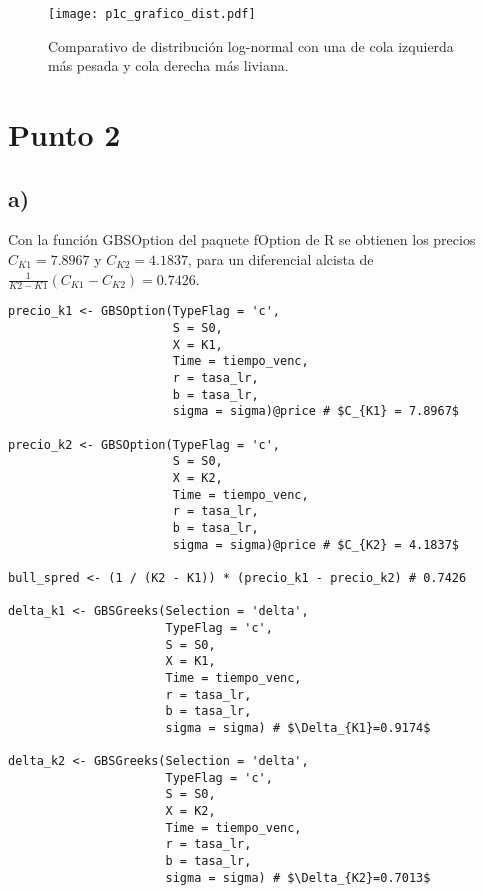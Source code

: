 \documentclass{tufte-handout}
\begin{document}
\begin{figure}
\centering
\texttt{[image: p1c\_grafico\_dist.pdf]}
\caption{Comparativo de distribución log-normal con una de cola izquierda más pesada y cola derecha más liviana.}
\label{fig:p1c_grafico_dist}
\end{figure}

\section*{Punto 2}

\subsection*{a)}

Con la función GBSOption del paquete fOption de R se obtienen los precios $C_{K1} = 7.8967$ y $C_{K2} = 4.1837$, para un diferencial alcista de $\frac{1}{K2 - K1} (C_{K1} - C_{K2}) = 0.7426$.

\begin{verbatim}
precio_k1 <- GBSOption(TypeFlag = 'c',
                       S = S0,
                       X = K1,
                       Time = tiempo_venc,
                       r = tasa_lr,
                       b = tasa_lr,
                       sigma = sigma)@price # $C_{K1} = 7.8967$

precio_k2 <- GBSOption(TypeFlag = 'c',
                       S = S0,
                       X = K2,
                       Time = tiempo_venc,
                       r = tasa_lr,
                       b = tasa_lr,
                       sigma = sigma)@price # $C_{K2} = 4.1837$

bull_spred <- (1 / (K2 - K1)) * (precio_k1 - precio_k2) # 0.7426

delta_k1 <- GBSGreeks(Selection = 'delta',
                      TypeFlag = 'c',
                      S = S0,
                      X = K1,
                      Time = tiempo_venc,
                      r = tasa_lr,
                      b = tasa_lr,
                      sigma = sigma) # $\Delta_{K1}=0.9174$

delta_k2 <- GBSGreeks(Selection = 'delta',
                      TypeFlag = 'c',
                      S = S0,
                      X = K2,
                      Time = tiempo_venc,
                      r = tasa_lr,
                      b = tasa_lr,
                      sigma = sigma) # $\Delta_{K2}=0.7013$
\end{verbatim}
\end{document}
